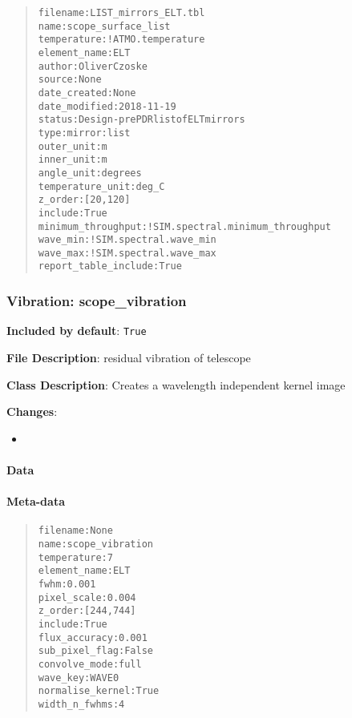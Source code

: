 \documentclass[a4paper]{article}
\begin{document}
\begin{quote}
\begin{alltt}
            filename : LIST_mirrors_ELT.tbl
                name : scope_surface_list
         temperature : !ATMO.temperature
        element_name : ELT
              author : Oliver Czoske
              source : None
        date_created : None
       date_modified : 2018-11-19
              status : Design - pre PDR list of ELT mirrors
                type : mirror:list
          outer_unit : m
          inner_unit : m
          angle_unit : degrees
    temperature_unit : deg_C
             z_order : [20, 120]
             include : True
  minimum_throughput : !SIM.spectral.minimum_throughput
            wave_min : !SIM.spectral.wave_min
            wave_max : !SIM.spectral.wave_max
report_table_include : True
\end{alltt}
\end{quote}


\subsubsection{Vibration: \textquotedbl{}scope\_vibration\textquotedbl{}%
  \label{vibration-scope-vibration}%
}

\textbf{Included by default}: \texttt{True}

\textbf{File Description}: residual vibration of telescope

\textbf{Class Description}: Creates a wavelength independent kernel image

\textbf{Changes}:

\begin{itemize}
\item \end{itemize}


\paragraph{Data%
  \label{id9}%
}


\paragraph{Meta-data%
  \label{id10}%
}

\begin{quote}
\begin{alltt}
        filename : None
            name : scope_vibration
     temperature : 7
    element_name : ELT
            fwhm : 0.001
     pixel_scale : 0.004
         z_order : [244, 744]
         include : True
   flux_accuracy : 0.001
  sub_pixel_flag : False
   convolve_mode : full
        wave_key : WAVE0
normalise_kernel : True
   width_n_fwhms : 4
\end{alltt}
\end{quote}
\end{document}
